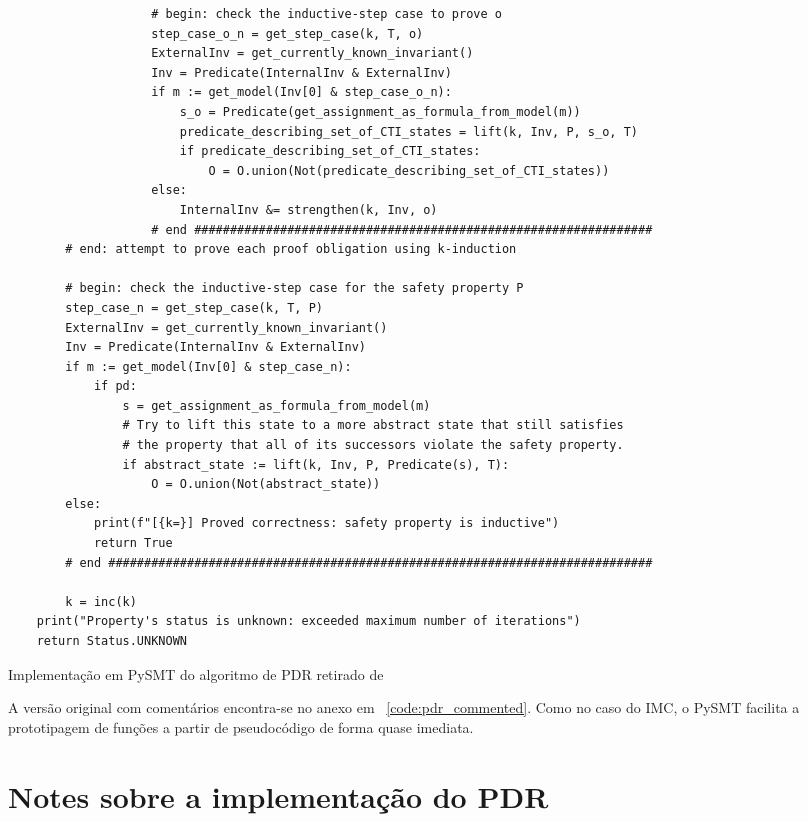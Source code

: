 \documentclass[11pt,a4paper]{report}%
\newenvironment{code}{\captionsetup{type=listing}}{}
\begin{document}
\begin{code}
\begin{verbatim}
                    # begin: check the inductive-step case to prove o
                    step_case_o_n = get_step_case(k, T, o)
                    ExternalInv = get_currently_known_invariant()
                    Inv = Predicate(InternalInv & ExternalInv)
                    if m := get_model(Inv[0] & step_case_o_n):
                        s_o = Predicate(get_assignment_as_formula_from_model(m))
                        predicate_describing_set_of_CTI_states = lift(k, Inv, P, s_o, T)
                        if predicate_describing_set_of_CTI_states:
                            O = O.union(Not(predicate_describing_set_of_CTI_states))
                    else:
                        InternalInv &= strengthen(k, Inv, o)
                    # end ################################################################
        # end: attempt to prove each proof obligation using k-induction

        # begin: check the inductive-step case for the safety property P
        step_case_n = get_step_case(k, T, P)
        ExternalInv = get_currently_known_invariant()
        Inv = Predicate(InternalInv & ExternalInv)
        if m := get_model(Inv[0] & step_case_n):
            if pd:
                s = get_assignment_as_formula_from_model(m)
                # Try to lift this state to a more abstract state that still satisfies
                # the property that all of its successors violate the safety property.
                if abstract_state := lift(k, Inv, P, Predicate(s), T):
                    O = O.union(Not(abstract_state))
        else:
            print(f"[{k=}] Proved correctness: safety property is inductive")
            return True
        # end ############################################################################

        k = inc(k)
    print("Property's status is unknown: exceeded maximum number of iterations")
    return Status.UNKNOWN\end{verbatim}
\caption{Implementação em PySMT do algoritmo de PDR retirado de \cite{pdr_state_of_art}}
\label{code:pdr}
\end{code}

A versão original com comentários encontra-se no anexo em ~\ref{code:pdr_commented}.
Como no caso do IMC, o PySMT facilita a prototipagem de funções a partir de pseudocódigo
de forma quase imediata.\\

\section*{Notes sobre a implementação do PDR}
\label{pdr:notes}
\end{document}

